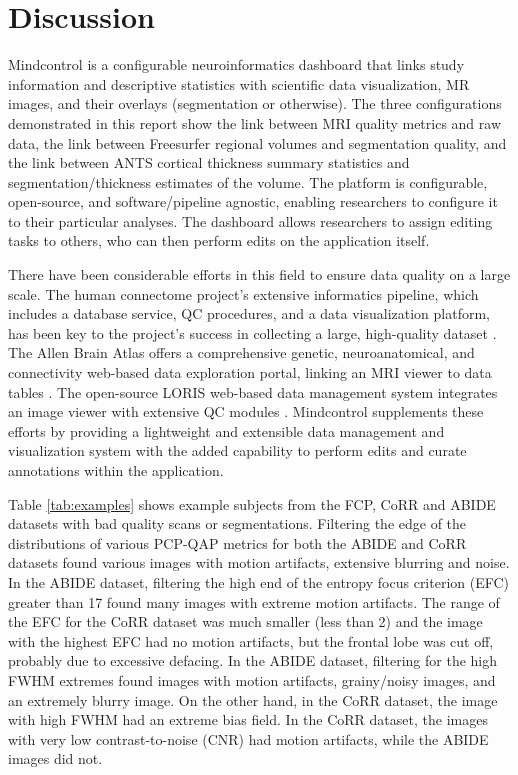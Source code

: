 \section{Discussion}

Mindcontrol is a configurable neuroinformatics dashboard that links study information and descriptive statistics with scientific data visualization, MR images, and their overlays (segmentation or otherwise). The three configurations demonstrated in this report show the link between MRI quality metrics and raw data, the link between Freesurfer regional volumes and segmentation quality, and the link between ANTS cortical thickness summary statistics and segmentation/thickness estimates of the volume. The platform is configurable, open-source, and software/pipeline agnostic, enabling researchers to configure it to their particular analyses. The dashboard allows researchers to assign editing tasks to others, who can then perform edits on the application itself. 

There have been considerable efforts in this field to ensure data quality on a large scale. The human connectome project's extensive informatics pipeline, which includes a database service, QC procedures, and a data visualization platform, has been key to the project's success in collecting a large, high-quality dataset \cite{Marcus_2013}. The Allen Brain Atlas offers a comprehensive genetic, neuroanatomical, and connectivity web-based data exploration portal, linking an MRI viewer to data tables \cite{Sunkin_2012}. The open-source LORIS web-based data management system integrates an image viewer with extensive QC modules \cite{Das_2012}. Mindcontrol supplements these efforts by providing a lightweight and extensible data management and visualization system with the added capability to perform edits and curate annotations within the application. 

Table \ref{tab:examples} shows example subjects from the FCP, CoRR and ABIDE datasets with bad quality scans or segmentations. Filtering the edge of the distributions of various PCP-QAP metrics for both the ABIDE and CoRR datasets found various images with motion artifacts, extensive blurring and noise. In the ABIDE dataset, filtering the high end of the entropy focus criterion (EFC) greater than 17 found many images with extreme motion artifacts. The range of the EFC for the CoRR dataset was much smaller (less than 2) and the image with the highest EFC had no motion artifacts, but the frontal lobe was cut off, probably due to excessive defacing. In the ABIDE dataset, filtering for the high FWHM extremes found images with motion artifacts, grainy/noisy images, and an extremely blurry image. On the other hand, in the CoRR dataset, the image with high FWHM had an extreme bias field. In the CoRR dataset, the images with very low contrast-to-noise (CNR) had motion artifacts, while the ABIDE images did not. 


